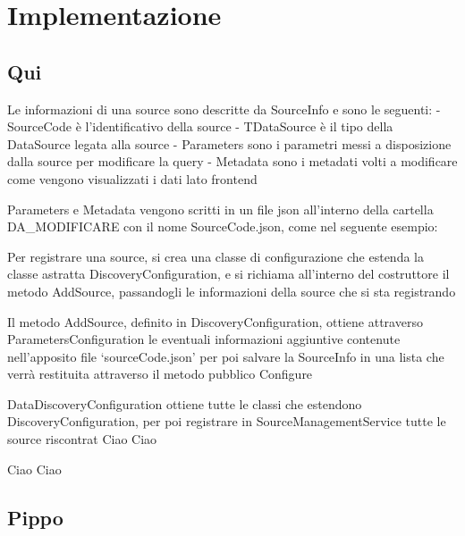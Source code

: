 \chapter{Implementazione}

\section{Qui}
Le informazioni di una source sono descritte da SourceInfo e sono le seguenti:
- SourceCode è l’identificativo della source
- TDataSource è il tipo della DataSource legata alla source
- Parameters sono i parametri messi a disposizione dalla source per modificare la query
- Metadata sono i metadati volti a modificare come vengono visualizzati i dati lato frontend

Parameters e Metadata vengono scritti in un file json all’interno della cartella {{DA_MODIFICARE}} con il nome {{SourceCode}}.json, come nel seguente esempio:

Per registrare una source, si crea una classe di configurazione che estenda la classe astratta DiscoveryConfiguration, e si richiama all’interno del costruttore il metodo AddSource, passandogli le informazioni della source che si sta registrando

Il metodo AddSource, definito in DiscoveryConfiguration, ottiene attraverso ParametersConfiguration le eventuali informazioni aggiuntive contenute nell’apposito file ‘{sourceCode}.json’ per poi salvare la SourceInfo in una lista che verrà restituita attraverso il metodo pubblico Configure

DataDiscoveryConfiguration ottiene tutte le classi che estendono DiscoveryConfiguration, per poi registrare in SourceManagementService tutte le source riscontrat
\newpage
Ciao Ciao


Ciao Ciao


\section{Pippo}




